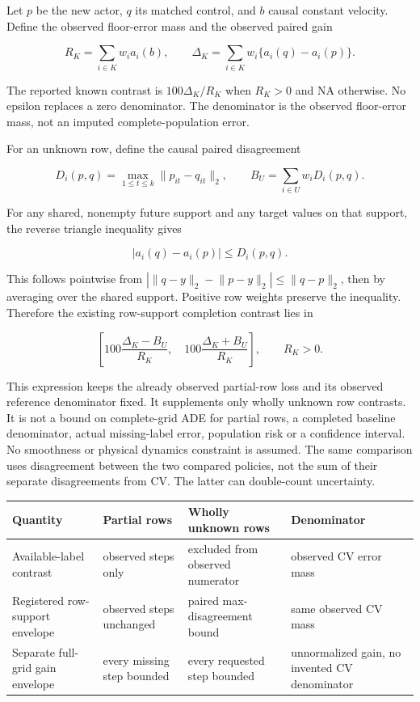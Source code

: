 \documentclass[10pt,twocolumn,letterpaper]{article}
\begin{document}
Let $p$ be the new actor, $q$ its matched control, and $b$ causal constant velocity. Define the observed floor-error mass and the observed paired gain


\[
R_K=\sum_{i\in K}w_i a_i(b),\qquad
\Delta_K=\sum_{i\in K}w_i\{a_i(q)-a_i(p)\}.
\]

The reported known contrast is $100\Delta_K/R_K$ when $R_K>0$ and NA otherwise. No epsilon replaces a zero denominator. The denominator is the observed floor-error mass, not an imputed complete-population error.


For an unknown row, define the causal paired disagreement


\[
D_i(p,q)=\max_{1\leq t\leq k}\lVert p_{it}-q_{it}\rVert_2,
\qquad B_U=\sum_{i\in U}w_iD_i(p,q).
\]

For any shared, nonempty future support and any target values on that support, the reverse triangle inequality gives


\[
|a_i(q)-a_i(p)|\leq D_i(p,q).
\]

This follows pointwise from $|\lVert q-y\rVert_2-\lVert p-y\rVert_2|\leq\lVert q-p\rVert_2$, then by averaging over the shared support. Positive row weights preserve the inequality. Therefore the existing row-support completion contrast lies in


\[
\left[100\frac{\Delta_K-B_U}{R_K},\quad
100\frac{\Delta_K+B_U}{R_K}\right],\qquad R_K>0.
\]

This expression keeps the already observed partial-row loss and its observed reference denominator fixed. It supplements only wholly unknown row contrasts. It is not a bound on complete-grid ADE for partial rows, a completed baseline denominator, actual missing-label error, population risk or a confidence interval. No smoothness or physical dynamics constraint is assumed. The same comparison uses disagreement between the two compared policies, not the sum of their separate disagreements from CV. The latter can double-count uncertainty.


\noindent\begin{minipage}{\columnwidth}\small
{}
\setlength{\tabcolsep}{4pt}
\begin{tabularx}{\columnwidth}{>{\raggedright\arraybackslash}X>{\raggedright\arraybackslash}X>{\raggedright\arraybackslash}X>{\raggedright\arraybackslash}X}\toprule
\textbf{Quantity} & \textbf{Partial rows} & \textbf{Wholly unknown rows} & \textbf{Denominator} \\\midrule
Available-label contrast & observed steps only & excluded from observed numerator & observed CV error mass \\
Registered row-support envelope & observed steps unchanged & paired max-disagreement bound & same observed CV mass \\
Separate full-grid gain envelope & every missing step bounded & every requested step bounded & unnormalized gain, no invented CV denominator \\
\bottomrule\end{tabularx}
\end{minipage}\par\medskip
\end{document}
